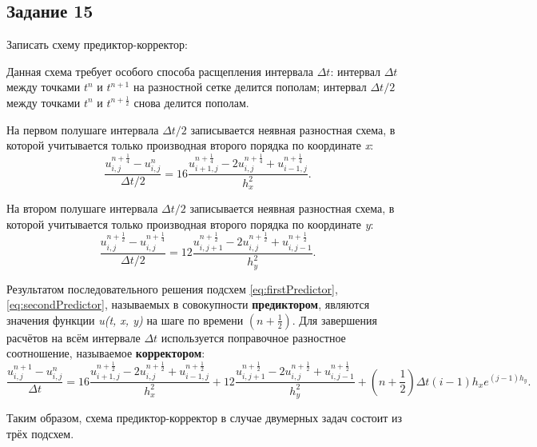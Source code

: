 \documentclass[12pt, a4paper]{report}
\begin{document}
	\subsection*{Задание 15}
	\large
	Записать схему предиктор-корректор: \par
	Данная схема требует особого способа расщепления интервала $\Delta t$: интервал $\Delta t$ между точками $t^{n}$ и $t^{n+1}$ на разностной сетке делится пополам; интервал $\Delta t/2$ между точками $t^{n}$ и $t^{n+\frac{1}{2}}$ снова делится пополам. \par
	На первом полушаге интервала $\Delta t/2$ записывается неявная разностная схема, в которой учитывается только производная второго порядка по координате \textit{x}:
	\begin{equation}\label{eq:firstPredictor}
		\frac{u_{i, j}^{n+\frac{1}{4}} - u_{i, j}^{n}}{\Delta t/2} = 16\frac{u_{i+1, j}^{n+\frac{1}{4}} - 2u_{i, j}^{n+\frac{1}{4}} + u_{i-1, j}^{n+\frac{1}{4}}}{h_{x}^{2}}.
	\end{equation}
	\par
	На втором полушаге интервала $\Delta t/2$ записывается неявная разностная схема, в которой учитывается только производная второго порядка по координате \textit{y}:
	\begin{equation}\label{eq:secondPredictor}
		\frac{u_{i, j}^{n+\frac{1}{2}} - u_{i, j}^{n+\frac{1}{4}}}{\Delta t/2} = 12\frac{u_{i, j+1}^{n+\frac{1}{2}} - 2u_{i, j}^{n+\frac{1}{2}} + u_{i, j-1}^{n+\frac{1}{2}}}{h_{y}^{2}}.
	\end{equation}
	\par
	Результатом последовательного решения подсхем \eqref{eq:firstPredictor}, \eqref{eq:secondPredictor}, называемых в совокупности \textbf{предиктором}, являются значения функции \textit{u(t, x, y)} на шаге по времени $(n+\frac{1}{2})$. Для завершения расчётов на всём интервале $\Delta t$ используется поправочное разностное соотношение, называемое \textbf{корректором}:
	\small
	\begin{equation}\label{corrector}
		\frac{u_{i, j}^{n+1} - u_{i, j}^{n}}{\Delta t} = 16\frac{u_{i+1, j}^{n+\frac{1}{2}} - 2u_{i, j}^{n+\frac{1}{2}} + u_{i-1, j}^{n+\frac{1}{2}}}{h_{x}^{2}} + 12\frac{u_{i, j+1}^{n+\frac{1}{2}} - 2u_{i, j}^{n+\frac{1}{2}} + u_{i, j-1}^{n+\frac{1}{2}}}{h_{y}^{2}} + (n+\frac{1}{2})\Delta t(i-1)h_{x}e^{(j-1)h_{y}}.
	\end{equation}
	\par
	Таким образом, схема предиктор-корректор в случае двумерных задач состоит из трёх подсхем.
\end{document}
